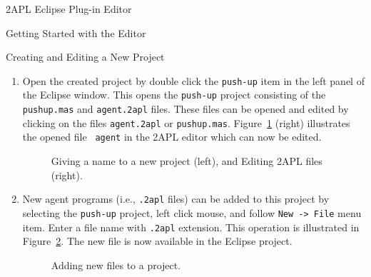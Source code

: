 \begin{chapter}{2APL Eclipse Plug-in Editor}
\begin{section}{Getting Started with the Editor}
\begin{subsection}{Creating and Editing a New Project}
\begin{enumerate}
        \item Open the created project by double click the {\tt push-up} item in the left panel of the Eclipse window.
        This opens the {\tt push-up} project consisting of the \texttt{pushup.mas} and {\tt agent.2apl}
        files. These files can be opened and edited by clicking on
        the files {\tt agent.2apl} or {\tt pushup.mas}.
        Figure~\ref{fig:usage3} (right) illustrates the opened file {\tt
        agent} in the 2APL editor which can now be edited.

        \begin{figure}[ht]
            \begin{minipage}{0.3\linewidth}
                \begin{center}
                \end{center}
            \end{minipage}
            \hspace{.5cm}
            \begin{minipage}{0.6\linewidth}
            \begin{center}
            \end{center}
            \end{minipage}
        \caption{Giving a name to a new project (left), and Editing 2APL files (right).}\label{fig:usage3}
        \end{figure}

        \item New agent programs (i.e., {\tt .2apl} files) can be added to this project by
        selecting the {\tt push-up} project, left click mouse, and
        follow {\tt New -> File} menu item. Enter a file name with
        {\tt .2apl} extension. This operation is illustrated in
        Figure~\ref{fig:newfile1}. The new file is now available in the Eclipse project.

            \begin{figure}[h]
                \begin{minipage}{0.6\linewidth}
                    \begin{center}
                    \end{center}
                \end{minipage}
                \begin{minipage}{0.4\linewidth}
                    \begin{center}
                    \end{center}
                \end{minipage}
                \caption{Adding new files to a project.}\label{fig:newfile1}
            \end{figure}


\end{enumerate}
\end{subsection}
\end{section}
\end{chapter}
